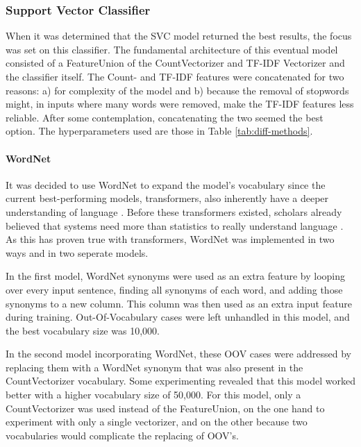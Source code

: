 \documentclass[final]{clv3} %
\begin{document}
\subsubsection{Support Vector Classifier}

When it was determined that the SVC model returned the best results, the focus was set on this classifier. The fundamental architecture of this eventual model consisted of a FeatureUnion of the CountVectorizer and TF-IDF Vectorizer and the classifier itself. The Count- and TF-IDF features were concatenated for two reasons: a) for complexity of the model and b) because the removal of stopwords might, in inputs where many words were removed, make the TF-IDF features less reliable. After some contemplation, concatenating the two seemed the best option. The hyperparameters used are those in Table \ref{tab:diff-methods}. 

\paragraph{\textbf{WordNet}}


It was decided to use WordNet \cite{miller} to expand the model’s vocabulary since the current best-performing models, transformers, also inherently have a deeper understanding of language \cite{gillioz}. Before these transformers existed, scholars already believed that systems need more than statistics to really understand language \cite{guess}. As this has proven true with transformers, WordNet was implemented in two ways and in two seperate models.

In the first model, WordNet synonyms were used as an extra feature by looping over every input sentence, finding all synonyms of each word, and adding those synonyms to a new column. This column was then used as an extra input feature during training. Out-Of-Vocabulary cases were left unhandled in this model, and the best vocabulary size was 10,000.

In the second model incorporating WordNet, these OOV cases were addressed by replacing them with a WordNet synonym that was also present in the CountVectorizer vocabulary. Some experimenting revealed that this model worked better with a higher vocabulary size of 50,000. For this model, only a CountVectorizer was used instead of the FeatureUnion, on the one hand to experiment with only a single vectorizer, and on the other because two vocabularies would complicate the replacing of OOV's.
\end{document}
